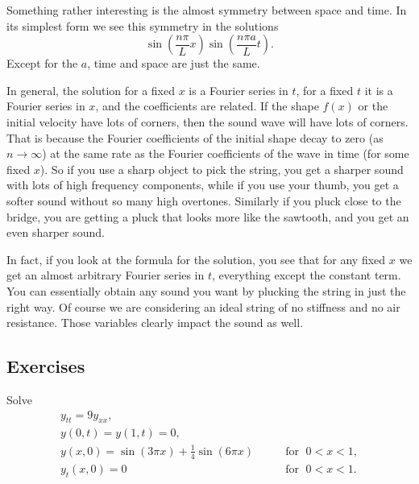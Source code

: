 Something rather interesting is the almost symmetry between space and time.
In its simplest form we see this symmetry in the solutions
\begin{equation*}
\sin \left( \frac{n \pi}{L} x \right)
\sin \left( \frac{n \pi a}{L} t \right)  .
\end{equation*}
Except for the $a$, time and space are just the same.

In general, the solution for a fixed $x$ is a Fourier series in $t$, for
a fixed $t$ it is a Fourier series in $x$, and the coefficients are related.
If the shape $f(x)$ or the initial velocity have lots of corners, then
the sound wave will have lots of corners.  That is because the Fourier coefficients
of the initial shape decay to zero (as $n \to \infty$) at the same rate as the Fourier coefficients
of the wave in time (for some fixed $x$).  So if you use a sharp object to
pick the string, you get a sharper sound with lots of high frequency
components, while if you use your thumb, you get a softer sound without
so many high overtones.  Similarly if you pluck close to the bridge, you are
getting a pluck that looks more like the sawtooth, and you get an even
sharper sound.

In fact, if you look at the formula for the solution, you see that for any
fixed $x$ we get an almost arbitrary Fourier series in $t$, everything
except the constant term.  You can essentially obtain any sound you want
by plucking the string in just the right way.
Of course we are considering an ideal string of no stiffness and no air
resistance.  Those variables clearly impact the sound as well.

\subsection{Exercises}

\begin{exercise}
Solve
\begin{equation*}
\begin{array}{ll}
y_{tt} = 9 y_{xx} , &  \\
y(0,t) = y(1,t) = 0 , &  \\
y(x,0) = \sin (3\pi x) + \frac{1}{4} \sin (6 \pi x) & \qquad \text{for } \; 0 < x < 1 , \\
y_t(x,0) = 0 & \qquad \text{for } \; 0 < x < 1 .
\end{array}
\end{equation*}
\end{exercise}

